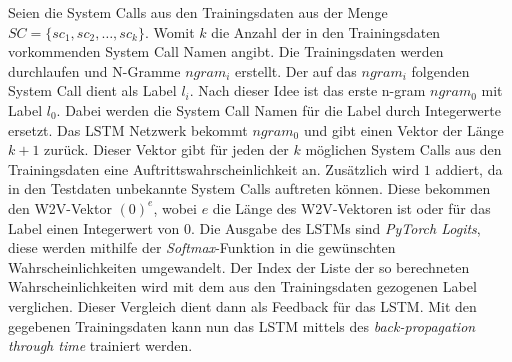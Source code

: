             Seien die System Calls aus den Trainingsdaten aus der Menge $SC = \{sc_1,sc_2,\dots,sc_k\}$.
            Womit $k$ die Anzahl der in den Trainingsdaten vorkommenden System Call Namen angibt.
            Die Trainingsdaten werden durchlaufen und N-Gramme $ngram_i$ erstellt.
            Der auf das $ngram_i$ folgenden System Call dient als Label $l_i$.
            Nach dieser Idee ist das erste n-gram $ngram_0$ mit Label $l_0$.
            Dabei werden die System Call Namen für die Label durch Integerwerte ersetzt. 
            Das \ac{LSTM} Netzwerk bekommt $ngram_0$ und gibt einen Vektor der Länge $k+1$ zurück.
            Dieser Vektor gibt für jeden der $k$ möglichen System Calls aus den Trainingsdaten eine Auftrittswahrscheinlichkeit an.
            Zusätzlich wird $1$ addiert, da in den Testdaten unbekannte System Calls auftreten können.
            Diese bekommen den \ac{W2V}-Vektor $(0)^e$, wobei $e$ die Länge des \ac{W2V}-Vektoren ist oder für das Label einen Integerwert von $0$. 
            Die Ausgabe des \acp{LSTM} sind \textit{PyTorch Logits}, diese werden mithilfe der \textit{Softmax}-Funktion in die gewünschten Wahrscheinlichkeiten umgewandelt.
            Der Index der Liste der so berechneten Wahrscheinlichkeiten wird mit dem aus den Trainingsdaten gezogenen Label verglichen.
            Dieser Vergleich dient dann als Feedback für das \ac{LSTM}.
            Mit den gegebenen Trainingsdaten kann nun das \ac{LSTM} mittels des \textit{back-propagation through time}  trainiert werden.

